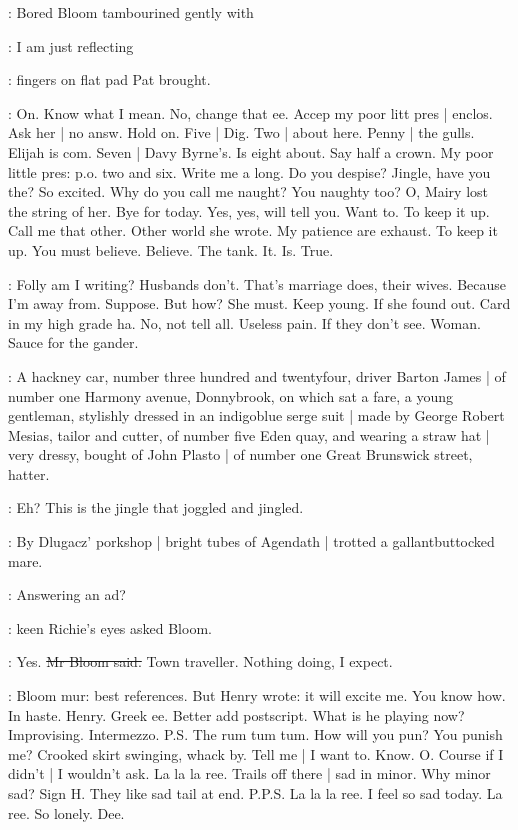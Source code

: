 :
Bored Bloom tambourined gently with

\BloomInt:
I am just reflecting

:
fingers on flat pad Pat brought.

\BloomInt:
On.
Know what I mean.
No,
change that ee.
Accep my poor litt pres |
enclos.
Ask her |
no answ.
Hold on.
Five |
Dig.
Two |
about here.
Penny |
the gulls.
Elijah is com.
Seven |
Davy Byrne's.
Is eight about.
Say half a crown.
My poor little pres:
p.o.
two and six.
Write me a long.
Do you despise?
Jingle,
have you the?
So excited.
Why do you call me naught?
You naughty too?
O,
Mairy lost the string of her.
Bye for today.
Yes,
yes,
will tell you.
Want to.
To keep it up.
Call me that other.
Other world she wrote.
My patience are exhaust.
To keep it up.
You must believe.
Believe.
The tank.
It.
Is.
True.

\BloomInt:
Folly am I writing?
Husbands don't.
That's marriage does,
their wives.
Because I'm away from.
Suppose.
But how?
She must.
Keep young.
If she found out.
Card in my high grade ha.
No,
not tell all.
Useless pain.
If they don't see.
Woman.
Sauce for the gander.

:
A hackney car,
number three hundred and twentyfour,
driver Barton James |
of number one Harmony avenue,
Donnybrook,
on which sat a fare,
a young gentleman,
stylishly dressed in an indigoblue serge suit |
made by George Robert Mesias,
tailor and cutter,
of number five Eden quay,
and wearing a straw hat |
very dressy,
bought of John Plasto |
of number one Great Brunswick street,
hatter.

\BloomInt:
Eh?
This is the jingle that joggled and jingled.

:
By Dlugacz' porkshop |
bright tubes of Agendath |
trotted a gallantbuttocked mare.

\goulding:
Answering an ad?

:
keen Richie's eyes asked Bloom.

\Bloom:
Yes.
\sout{Mr Bloom said.}
Town traveller.
Nothing doing,
I expect.

\BloomInt:
Bloom mur:
best references.
But Henry wrote:
it will excite me.
You know how.
In haste.
Henry.
Greek ee.
Better add postscript.
What is he playing now?
Improvising.
Intermezzo.
P.S.
The rum tum tum.
How will you pun?
You punish me?
Crooked skirt swinging,
whack by.
Tell me |
I want to.
Know.
O.
Course if I didn't |
I wouldn't ask.
La la la ree.
Trails off there |
sad in minor.
Why minor sad?
Sign H.
They like sad tail at end.
P.P.S.
La la la ree.
I feel so sad today.
La ree.
So lonely.
Dee.

